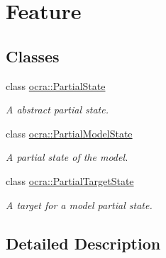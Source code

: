 \hypertarget{group__feature}{}\section{Feature}
\label{group__feature}
\subsection*{Classes}
\begin{DoxyCompactItemize}
\item 
class \hyperlink{classocra_1_1PartialState}{ocra\+::\+Partial\+State}
\begin{DoxyCompactList}\small\item\em A abstract partial state. \end{DoxyCompactList}\item 
class \hyperlink{classocra_1_1PartialModelState}{ocra\+::\+Partial\+Model\+State}
\begin{DoxyCompactList}\small\item\em A partial state of the model. \end{DoxyCompactList}\item 
class \hyperlink{classocra_1_1PartialTargetState}{ocra\+::\+Partial\+Target\+State}
\begin{DoxyCompactList}\small\item\em A target for a model partial state. \end{DoxyCompactList}\end{DoxyCompactItemize}


\subsection{Detailed Description}
